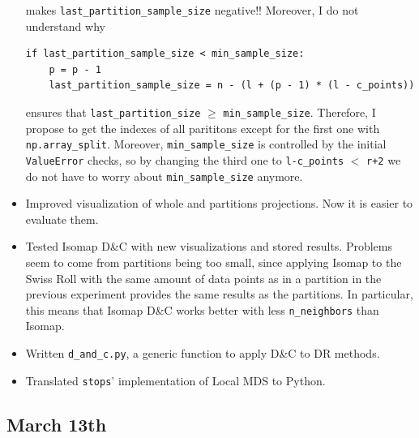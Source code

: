 \documentclass[a4paper,12pt]{article}
\begin{document}
\begin{itemize}
    makes \verb|last_partition_sample_size| negative!! Moreover, I do not understand why
    \begin{verbatim}
if last_partition_sample_size < min_sample_size:
    p = p - 1
    last_partition_sample_size = n - (l + (p - 1) * (l - c_points))
    \end{verbatim}
    ensures that \verb|last_partition_size| $\geq$ \verb|min_sample_size|. Therefore, I propose to get the indexes of all parititons except for the first one with \texttt{np.array\_split}. Moreover, \verb|min_sample_size| is controlled by the initial \verb|ValueError| checks, so by changing the third one to \verb|l-c_points| $<$ \verb|r+2| we do not have to worry about \verb|min_sample_size| anymore.
    \item Improved visualization of whole and partitions projections. Now it is easier to evaluate them.
    \item Tested Isomap D\&C with new visualizations and stored results. Problems seem to come from partitions being too small, since applying Isomap to the Swiss Roll with the same amount of data points as in a partition in the previous experiment provides the same results as the partitions. In particular, this means that Isomap D\&C works better with less \verb|n_neighbors| than Isomap.
    \item Written \verb|d_and_c.py|, a generic function to apply D\&C to DR methods.
    \item Translated \texttt{stops}' implementation of Local MDS to Python.
\end{itemize}

\subsection{March 13th}
\end{document}
